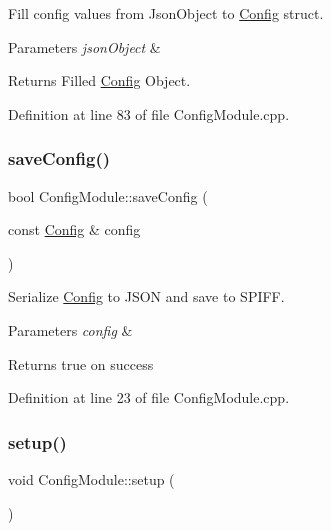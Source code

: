 Fill config values from Json\+Object to \mbox{\hyperlink{struct_config}{Config}} struct. 
\begin{DoxyParams}{Parameters}
{\em json\+Object} & \\
\hline
\end{DoxyParams}
\begin{DoxyReturn}{Returns}
Filled \mbox{\hyperlink{struct_config}{Config}} Object. 
\end{DoxyReturn}


Definition at line 83 of file Config\+Module.\+cpp.

\mbox{\label{class_config_module_ab7b7cb9aba4ab90bec664eef2b4a00f3}} 
\subsubsection{\texorpdfstring{saveConfig()}{saveConfig()}}
{\footnotesize\ttfamily bool Config\+Module\+::save\+Config (\begin{DoxyParamCaption}\item[{const \mbox{\hyperlink{struct_config}{Config}} \&}]{config }\end{DoxyParamCaption})}

Serialize \mbox{\hyperlink{struct_config}{Config}} to J\+S\+ON and save to S\+P\+I\+FF. 
\begin{DoxyParams}{Parameters}
{\em config} & \\
\hline
\end{DoxyParams}
\begin{DoxyReturn}{Returns}
true on success 
\end{DoxyReturn}


Definition at line 23 of file Config\+Module.\+cpp.

\mbox{\label{class_config_module_a3ab8220b02e11fdb12af8111ef77c6ac}} 
\subsubsection{\texorpdfstring{setup()}{setup()}}
{\footnotesize\ttfamily void Config\+Module\+::setup (\begin{DoxyParamCaption}{ }\end{DoxyParamCaption})}



